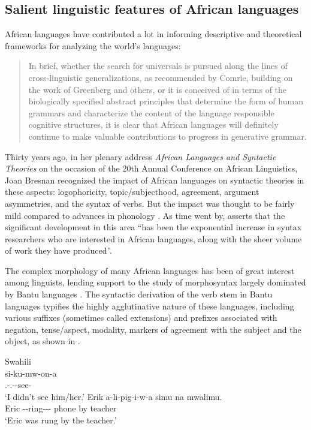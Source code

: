 \documentclass[output=paper,hidelinks]{langscibook}
\begin{document}
\subsection{Salient linguistic features of African languages}
\label{sec:African:1.2}

African languages have contributed a lot in informing descriptive and theoretical frameworks for analyzing the world’s languages:

\begin{quote}
In brief, whether the search for universals is pursued along the lines
of cross-linguistic generalizations, as recommended by Comrie,
building on the work of Greenberg and others, or it is conceived of in
terms of the biologically specified abstract principles that determine
the form of human grammars and characterize the content of the
language responsible cognitive structures, it is clear that African
languages will definitely continue to make valuable contributions to
progress in generative grammar.   \citep[202]{Mchombo1997}
\end{quote}

\largerpage
Thirty years ago, in her plenary address \textit{African Languages and Syntactic Theories} on the occasion of the 20th Annual Conference on African Linguistics, Joan Bresnan recognized the impact of African languages on syntactic theories in these aspects: logophoricity, topic/subjecthood, agreement, argument asymmetries, and the syntax of verbs. But the impact was thought to be fairly mild compared to advances in phonology \citep{Bresnan1990}. As time went by, \citet[15]{Henderson2011} asserts that the significant development in this area “has been the exponential increase in syntax researchers who are interested in African languages, along with the sheer volume of work they have produced”. 

The complex morphology of many African languages has been of great interest among linguists, lending support to the study of morphosyntax largely dominated by Bantu languages \citep{bresnan1995the-lexical,Mchombo1980,Mchombo1997,Mchombo:Arg,Mchombo2003,Mchombo2004,Moshi:Locatives,Morimoto:LFG2002,Matambirofa:Causative}. The syntactic derivation of the verb stem in Bantu languages typifies the highly agglutinative nature of these languages, including various suffixes (sometimes called extensions) and prefixes associated with negation, tense/aspect, modality, markers of agreement with the subject and the object, as shown in .

\ea\label{ex:African:1} Swahili \citep[152--153]{Petzell2004}\\
\ea\label{ex:African:1a}
\gll si{}-ku-mw-on-a\\
     {\NEG}.-{\NEG}.--see-   \\
\glt‘I didn’t see him/her.’
\ex\label{ex:African:1b}
\gll  Erik a-li-pig-i-w-a simu na mwalimu.\\
      Eric  -{\PST}-ring-{}-{\PASS}- phone by  teacher\\    
\glt ‘Eric was rung by the teacher.’
\z
\z
\end{document}

